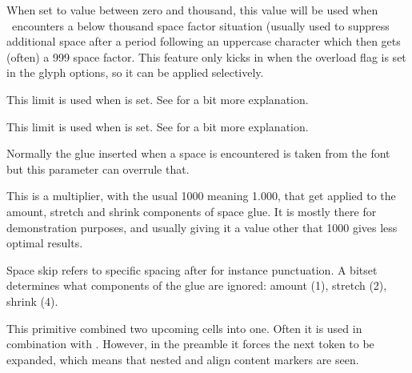 \stopnewprimitive

\startnewprimitive[title={\prm {spacefactoroverload}}]

When set to value between zero and thousand, this value will be used when \TEX\
encounters a below thousand space factor situation (usually used to suppress
additional space after a period following an uppercase character which then gets
(often) a 999 space factor. This feature only kicks in when the overload flag is
set in the glyph options, so it can be applied selectively.

\stopnewprimitive

\startnewprimitive[title={\prm {spacefactorshrinklimit}}]

This limit is used when  is set. See  for a
bit more explanation.

\stopnewprimitive

\startnewprimitive[title={\prm {spacefactorstretchlimit}}]

This limit is used when  is set. See  for a
bit more explanation.

\stopnewprimitive

\startoldprimitive[title={\prm {spaceskip}}]

Normally the glue inserted when a space is encountered is taken from the font but
this parameter can overrule that.

\stopoldprimitive

\startnewprimitive[title={\prm {spaceskipfactor}}]

This is a multiplier, with the usual 1000 meaning 1.000, that get applied to the
amount, stretch and shrink components of space glue. It is mostly there for
demonstration purposes, and usually giving it a value other that 1000 gives less
optimal results.

\stopnewprimitive

\startnewprimitive[title={\prm {spaceskipmode}}]

Space skip refers to specific spacing after for instance punctuation. A bitset
determines what components of the glue are ignored: amount (1), stretch (2),
shrink (4).

\stopnewprimitive

\startoldprimitive[title={\prm {span}}]

This primitive combined two upcoming cells into one. Often it is used in
combination with \prm {omit}. However, in the preamble it forces the next token
to be expanded, which means that nested \prm {tabskips} and align content markers
are seen.

